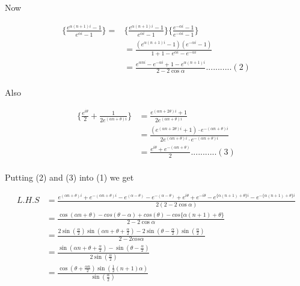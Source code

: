 \documentclass[fleqn]{article}
\begin{document}
Now

\begin{align*}	
\Big\{\frac{e^{\alpha(n+1)i}-1}{e^{\alpha i}-1}\Big\}=& \Big\{\frac{e^{\alpha(n+1)i}-1}{e^{\alpha i}-1}\Big\}\Big\{\frac{e^{-\alpha i}-1}{e^{-\alpha i}-1}\Big\}\\
	&=\frac{(e^{\alpha(n+1)i}-1)(e^{-\alpha i}-1)}{1+1-e^{\alpha i}-e^{-\alpha i}}\\
	&=\frac{e^{\alpha ni}-e^{-\alpha i}+1-e^{\alpha(n+1)i}}{2-2\cos\alpha}...........(2)\\
\end{align*}

Also

\begin{align*}
\Big\{\frac{e^{i\theta}}{2}+\frac{1}{2e^{(\alpha n+\theta)i}}\Big\} &= \frac{e^{(\alpha n+2\theta)i}+1}{2e^{(\alpha n+\theta)i}}\\
		&=\frac{(e^{(\alpha n+2\theta)i}+1)\cdot e^{-(\alpha n+\theta)i}}{2e^{(\alpha n+\theta)i}\cdot e^{-(\alpha n+\theta)i}}\\
		&=\frac{e^{i\theta}+e^{-(\alpha n+\theta)}}{2}...........(3)\\
\end{align*}

Putting (2) and (3) into (1) we get

\begin{align*}
L.H.S &= \frac{e^{(\alpha n+\theta)i}+e^{-(\alpha n+\theta)i}-e^{(\alpha-\theta)}-e^{-(\alpha-\theta)}+e^{i\theta}+e^{-i\theta}-e^{\{\alpha(n+1)+\theta \}i}-e^{-\{\alpha(n+1)+\theta\}i}}{2(2-2\cos\alpha)}\\
&=\frac{\cos(\alpha n+\theta)-cos(\theta-\alpha)+cos(\theta)-cos\{\alpha(n+1)+\theta\}}{2-2\cos\alpha}\\
&=\frac{2\sin(\frac{\alpha}{2})\sin(\alpha n +\theta+\frac{\alpha}{2})-2\sin(\theta-\frac{\alpha}{2})\sin(\frac{\alpha}{2})}{2-2cos\alpha}\\
&=\frac{\sin(\alpha n+\theta+\frac{\alpha}{2})-\sin(\theta-\frac{\alpha}{2})}{2\sin(\frac{\alpha}{2})}\\
&=\frac{\cos(\theta+\frac{\alpha n}{2})\sin(\frac{1}{2}(n+1)\alpha)}{\sin(\frac{\alpha}{2})}
\end{align*}

\begin{flushright}
[Proved]
\end{flushright}
\end{document}
